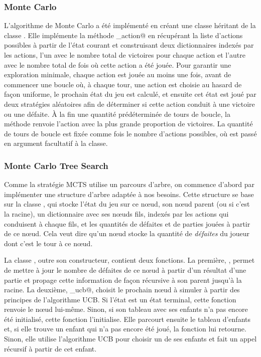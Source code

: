 \documentclass[a4paper,11pt]{article}
\begin{document}
\subsubsection{Monte Carlo}

L'algorithme de Monte Carlo a été implémenté en créant une classe \verb@AgentMC@ héritant de la classe \verb@Agent@. Elle implémente la méthode \verb@get_action@ en récupérant la liste d'actions possibles à partir de l'état courant et construisant deux dictionnaires indexés par les actions, l'un avec le nombre total de victoires pour chaque action et l'autre avec le nombre total de fois où cette action a été jouée. Pour garantir une exploration minimale, chaque action est jouée au moins une fois, avant de commencer une boucle où, à chaque tour, une action est choisie au hasard de façon uniforme, le prochain état du jeu est calculé, et ensuite cet état est joué par deux stratégies aléatoires afin de déterminer si cette action conduit à une victoire ou une défaite. À la fin une quantité prédéterminée de tours de boucle, la méthode renvoie l'action avec la plus grande proportion de victoires. La quantité de tours de boucle est fixée comme \verb@n@ fois le nombre d'actions possibles, où \verb@n@ est passé en argument facultatif à la classe.

\subsubsection{Monte Carlo Tree Search}

Comme la stratégie MCTS utilise un parcours d'arbre, on commence d'abord par implémenter une structure d'arbre adaptée à nos besoins. Cette structure se base sur la classe \verb@Noeud@, qui stocke l'état du jeu sur ce n\oe{}ud, son n\oe{}ud parent (ou \verb@None@ si c'est la racine), un dictionnaire avec ses n\oe{}uds fils, indexés par les actions qui conduisent à chaque fils, et les quantités de défaites et de parties jouées à partir de ce n\oe{}ud. Cela veut dire qu'un n\oe{}ud stocke la quantité de \emph{défaites} du joueur dont c'est le tour à ce n\oe{}ud.

La classe \verb@Noeud@, outre son constructeur, contient deux fonctions. La première, \verb@maj@, permet de mettre à jour le nombre de défaites de ce n\oe{}ud à partir d'un résultat d'une partie et propage cette information de façon récursive à son parent jusqu'à la racine. La deuxième, \verb@choix_ucb@, choisit le prochain n\oe{}ud à simuler à partir des principes de l'algorithme UCB. Si l'état est un état terminal, cette fonction renvoie le n\oe{}ud lui-même. Sinon, si son tableau avec ses enfants n'a pas encore été initialisé, cette fonction l'initialise. Elle parcourt ensuite le tableau d'enfants et, si elle trouve un enfant qui n'a pas encore été joué, la fonction lui retourne. Sinon, elle utilise l'algorithme UCB pour choisir un de ses enfants et fait un appel récursif à partir de cet enfant.
\end{document}
